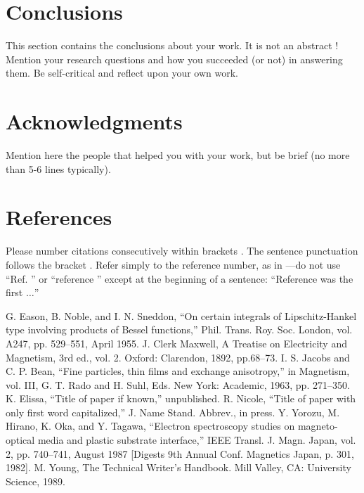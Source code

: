 \documentclass[conference]{IEEEtran}
\begin{document}
\section*{Conclusions}

This section contains the conclusions about your work. It is not an abstract ! Mention your research questions and how you succeeded (or not) in answering them. Be self-critical and reflect upon your own work.

\section*{Acknowledgments}

Mention here the people that helped you with your work, but be brief (no more than 5-6 lines typically).

\section*{References}

Please number citations consecutively within brackets \cite{b1}. The 
sentence punctuation follows the bracket \cite{b2}. Refer simply to the reference 
number, as in \cite{b3}---do not use ``Ref. \cite{b3}'' or ``reference \cite{b3}'' except at 
the beginning of a sentence: ``Reference \cite{b3} was the first $\ldots$''

\begin{thebibliography}{00}

 G. Eason, B. Noble, and I. N. Sneddon, ``On certain integrals of Lipschitz-Hankel type involving products of Bessel functions,'' Phil. Trans. Roy. Soc. London, vol. A247, pp. 529--551, April 1955.
 J. Clerk Maxwell, A Treatise on Electricity and Magnetism, 3rd ed., vol. 2. Oxford: Clarendon, 1892, pp.68--73.
 I. S. Jacobs and C. P. Bean, ``Fine particles, thin films and exchange anisotropy,'' in Magnetism, vol. III, G. T. Rado and H. Suhl, Eds. New York: Academic, 1963, pp. 271--350.
 K. Elissa, ``Title of paper if known,'' unpublished.
 R. Nicole, ``Title of paper with only first word capitalized,'' J. Name Stand. Abbrev., in press.
 Y. Yorozu, M. Hirano, K. Oka, and Y. Tagawa, ``Electron spectroscopy studies on magneto-optical media and plastic substrate interface,'' IEEE Transl. J. Magn. Japan, vol. 2, pp. 740--741, August 1987 [Digests 9th Annual Conf. Magnetics Japan, p. 301, 1982].
 M. Young, The Technical Writer's Handbook. Mill Valley, CA: University Science, 1989.
\end{thebibliography}
\end{document}
